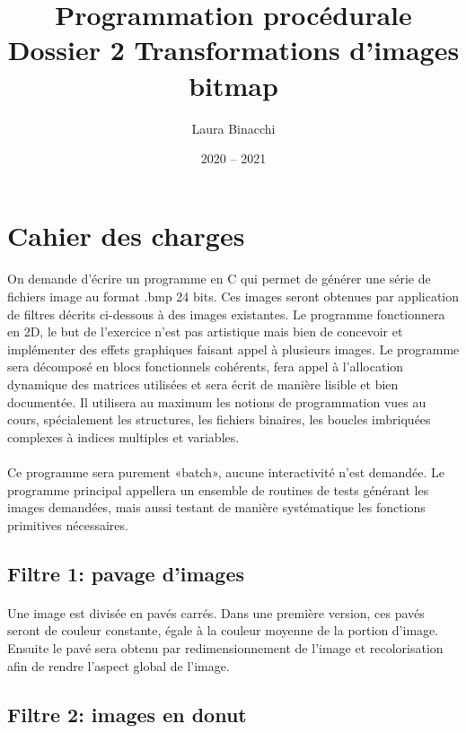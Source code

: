 \documentclass{article}
\title{}
\title{Programmation procédurale\bigbreak \bigbreak
    \large Dossier 2\bigbreak
    \normalsize Transformations d’images bitmap\bigbreak}
\date{2020 -- 2021}
\author{Laura Binacchi}
\begin{document}
    
    \newpage
    \tableofcontents
    \newpage

    \section{Cahier des charges}
    \paragraph{}
    On demande d’écrire un programme en C qui permet de générer une série de fichiers image au format .bmp 24 bits. Ces images seront  obtenues par application de filtres décrits ci-dessous à des images existantes. Le programme fonctionnera en 2D, le but de l’exercice n’est pas artistique mais bien de concevoir et implémenter des effets graphiques faisant appel à plusieurs images. Le programme sera décomposé en blocs fonctionnels cohérents, fera appel à l’allocation dynamique des matrices utilisées et sera écrit de manière lisible et bien documentée. Il utilisera au maximum les notions de programmation vues au cours, spécialement les structures, les fichiers binaires, les boucles imbriquées complexes à indices multiples et variables.

    \paragraph{}
    Ce programme sera purement «batch», aucune interactivité n’est demandée. Le programme principal appellera un ensemble de routines de tests générant les images demandées, mais aussi testant de manière systématique les fonctions primitives nécessaires.

    \subsection{Filtre 1: pavage d'images}
    \paragraph{}
    Une image est divisée en pavés carrés. Dans une première version, ces pavés seront de couleur constante, égale à la couleur moyenne de la portion d’image. Ensuite le pavé sera obtenu par redimensionnement de l’image et recolorisation afin de rendre l’aspect global de l’image.

    \subsection{Filtre 2: images en donut}
\end{document}

